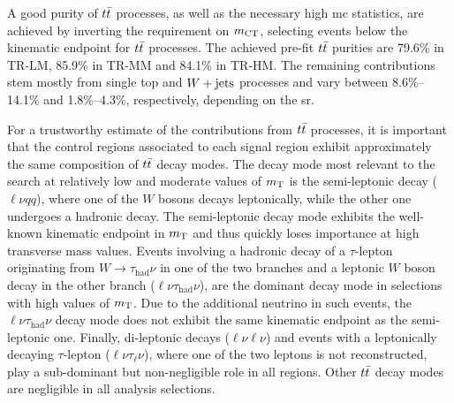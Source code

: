 A good purity of $t\bar{t}$ processes, as well as the necessary high \gls{mc} statistics, are achieved by inverting the requirement on $m_{\textrm{CT}}$, selecting events below the kinematic endpoint for $t\bar{t}$ processes.
The achieved pre-fit $t\bar{t}$ purities are 79.6\% in TR-LM, 85.9\% in TR-MM and 84.1\% in TR-HM.
The remaining contributions stem mostly from single top and $W+\mathrm{jets}$ processes and vary between 8.6\%--14.1\% and 1.8\%--4.3\%, respectively, depending on the \gls{sr}. 

For a trustworthy estimate of the contributions from $t\bar{t}$ processes, it is important that the control regions associated to each signal region exhibit approximately the same composition of $t\bar{t}$ decay modes.
The decay mode most relevant to the \onelepton search at relatively low and moderate values of $m_{\textrm{T}}$ is the semi-leptonic decay ($\ell\nu qq$), where one of the $W$ bosons decays leptonically, while the other one undergoes a hadronic decay.
The semi-leptonic decay mode exhibits the well-known kinematic endpoint in $m_{\textrm{T}}$ and thus quickly loses importance at high transverse mass values.
Events involving a hadronic decay of a $\tau$-lepton originating from $W\to\tau_\mathrm{had}\nu$ in one of the two branches and a leptonic $W$ boson decay in the other branch ($\ell\nu\tau_\mathrm{had}\nu$), are the dominant decay mode in selections with high values of $m_{\textrm{T}}$.
Due to the additional neutrino in such events, the $\ell\nu\tau_\mathrm{had}\nu$ decay mode does not exhibit the same kinematic endpoint as the semi-leptonic one.
Finally, di-leptonic decays ($\ell\nu\ell\nu$) and events with a leptonically decaying $\tau$-lepton ($\ell\nu\tau_\mathrm{\ell}\nu$), where one of the two leptons is not reconstructed, play a sub-dominant but non-negligible role in all regions.
Other $t\bar{t}$ decay modes are negligible in all analysis selections.

